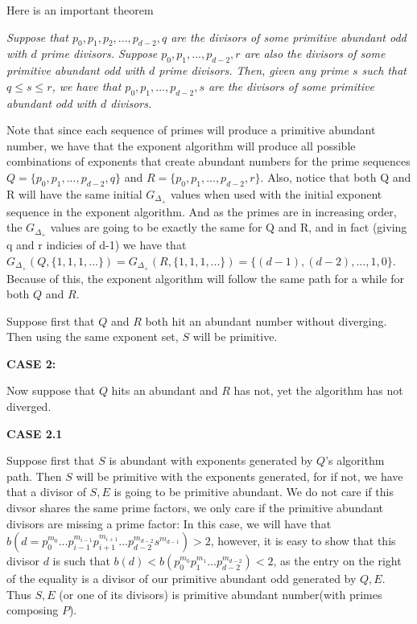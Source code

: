 \documentclass[../paper.tex]{subfiles}
\begin{document}

Here is an important theorem

\textit{Suppose that $p_0, p_1, p_2, ..., 
p_{d-2}, q$ are the divisors of some primitive abundant
odd with $d$ prime divisors. Suppose $p_0, p_1, ..., p_{d-2},r$ 
are also the divisors of some primitive abundant odd
with $d$ prime divisors. Then, given any prime $s$ such that $q \leq s 
\leq r$, we have that $p_0, p_1,..., p_{d-2}, s$ are the 
divisors of some primitive abundant odd with $d$ divisors.}

Note that since each sequence
of primes will produce a primitive abundant number, we have that
the exponent algorithm will produce all possible combinations of
exponents that create abundant numbers for the prime sequences $Q = 
\{p_0, p_1, ..., p_{d-2}, q\}$ and $R = \{p_0, p_1, ..., p_{d-2},
r\}$. Also, notice that both Q and R will have the same initial
$G_{\Delta_+}$ values when used with the initial exponent sequence
in the exponent algorithm. And as the primes are in increasing
order, the $G_{\Delta_+}$ values are going to be exactly the same
for Q and R, and in fact (giving q and r indicies of d-1) we have
that $G_{\Delta_+}(Q, \{1,1,1,...\}) = G_{\Delta_+}(R,
\{1,1,1,...\}) = \{(d-1), (d-2), ..., 1, 0\}$. Because of this,
the exponent algorithm will follow the same path for a while for
both $Q$ and $R$.

Suppose first that $Q$ and $R$ both hit an abundant number without
diverging. Then using the same exponent set, $S$ will be
primitive.

\textbf{CASE 2:}

Now suppose that $Q$ hits an abundant and $R$ has not, yet the
algorithm has not diverged. 

\textbf{CASE 2.1}

Suppose first that $S$ is abundant
with exponents generated by $Q$'s algorithm path. Then $S$ will be
primitive with the exponents generated, for if not, we have that
a divisor of $S,E$ is going to be primitive abundant. We do not
care if this divsor shares the same prime factors, we only care if
the primitive abundant divisors are missing a prime factor: In
this case, we will have that $b(d = p_0^{m_0} ... p_{i-1}^{m_{i-1}}
p_{i + 1}^{m_{i+1}}... p_{d-2}^{m_{d-2}} s^{m_{d-1}}) > 2$,
however, it is easy to show that this divisor $d$ is such that
$b(d) < b(p_0^{m_0} p_1^{m_1} ... p_{d-2}^{m_{d-2}}) < 2$, as the
entry on the right of the equality is a divisor of our primitive
abundant odd generated by $Q,E$. Thus $S,E$ (or one of its
divisors) is primitive abundant number(with primes composing $P$).
\end{document}
